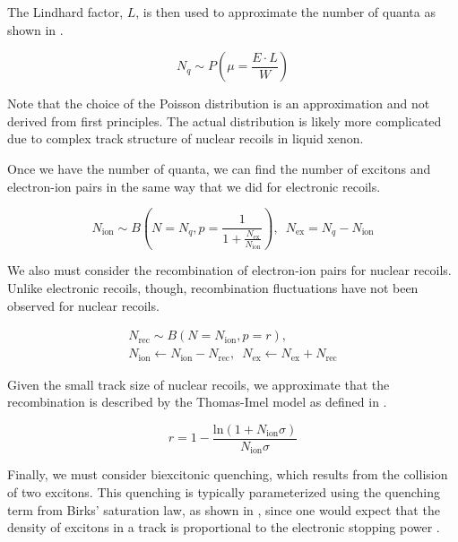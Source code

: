 The Lindhard factor, $L$, is then used to approximate the number of quanta as shown in .

\begin{equation}
        \label{eqn:xe1t_nr_quanta}
        N_q \sim P \left( \mu = \frac{E \cdot L}{W} \right)
\end{equation}

Note that the choice of the Poisson distribution is an approximation and not derived from first principles.  The actual distribution is likely more complicated due to complex track structure of nuclear recoils in liquid xenon.

Once we have the number of quanta, we can find the number of excitons and electron-ion pairs in the same way that we did for electronic recoils.

\begin{equation}
        \label{eqn:xe1t_nr_exciton_ion}
        N_{\textrm{ion}} \sim B \left( N=N_q, p = \frac{1}{1 + \frac{N_{\textrm{ex}}}{N_{\textrm{ion}}}} \right) , \, \, \, N_{\textrm{ex}} = N_q - N_{\textrm{ion}}
\end{equation}


We also must consider the recombination of electron-ion pairs for nuclear recoils.  Unlike electronic recoils, though, recombination fluctuations have not been observed for nuclear recoils.

\begin{equation}
        \label{eqn:xe1t_nr_recombination}
        \begin{gathered}
                N_{\textrm{rec}} \sim B(N = N_{\textrm{ion}}, p = r), \\ 
                N_{\textrm{ion}} \leftarrow N_{\textrm{ion}} - N_{\textrm{rec}}, \, \, \,  N_{\textrm{ex}} \leftarrow N_{\textrm{ex}} + N_{\textrm{rec}}
        \end{gathered}
\end{equation}

Given the small track size of nuclear recoils, we approximate that the recombination is described by the Thomas-Imel model \cite{thomas1987recombination} as defined in .


\begin{equation}
        \label{eqn:xe1t_ti_model}
        r = 1 - \frac{\textrm{ln}(1 + N_{\textrm{ion}} \sigma)}{N_{\textrm{ion}} \sigma}
\end{equation}


Finally, we must consider biexcitonic quenching, which results from the collision of two excitons.  This quenching is typically parameterized using the quenching term from Birks' saturation law, as shown in , since one would expect that the density of excitons in a track is proportional to the electronic stopping power \cite{mei2008model, tretyak2010semi, bezrukov2011interplay}. 

